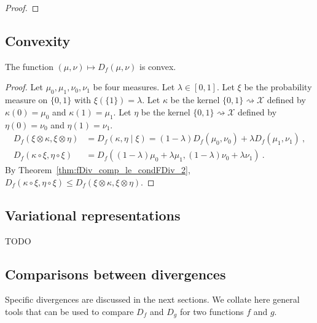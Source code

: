 \begin{proof}%
{}

\end{proof}

\subsection{Convexity}

\begin{theorem}
  \label{thm:fDiv_convex}
  The function $(\mu, \nu) \mapsto D_f(\mu, \nu)$ is convex.
\end{theorem}

\begin{proof}
Let $\mu_0, \mu_1, \nu_0, \nu_1$ be four measures. Let $\lambda \in [0,1]$. Let $\xi$ be the probability measure on $\{0,1\}$ with $\xi(\{1\}) = \lambda$.
Let $\kappa$ be the kernel $\{0,1\} \rightsquigarrow \mathcal X$ defined by $\kappa(0) = \mu_0$ and $\kappa(1) = \mu_1$.
Let $\eta$ be the kernel $\{0,1\} \rightsquigarrow \mathcal X$ defined by $\eta(0) = \nu_0$ and $\eta(1) = \nu_1$.
\begin{align*}
D_f(\xi \otimes \kappa, \xi \otimes \eta)
&= D_f(\kappa, \eta \mid \xi)
= (1 - \lambda) D_f(\mu_0, \nu_0) + \lambda D_f(\mu_1, \nu_1)
\: , \\
D_f(\kappa \circ \xi, \eta \circ \xi)
&= D_f((1 - \lambda)\mu_0 + \lambda \mu_1, (1 - \lambda)\nu_0 + \lambda \nu_1)
\: .
\end{align*}
By Theorem~\ref{thm:fDiv_comp_le_condFDiv_2}, $D_f(\kappa \circ \xi, \eta \circ \xi) \le D_f(\xi \otimes \kappa, \xi \otimes \eta)$.
\end{proof}




\subsection{Variational representations}

TODO


\subsection{Comparisons between divergences}

Specific divergences are discussed in the next sections. We collate here general tools that can be used to compare $D_f$ and $D_g$ for two functions $f$ and $g$.

